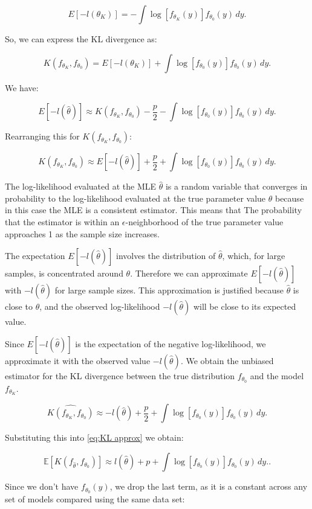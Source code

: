 \documentclass[
11pt, %
oneside, %
english, %
singlespacing, %
]{macthesis} %
\begin{document}
\[ 
E[-l(\theta_K)] = -\int \log[f_{\theta_K}(y)] f_{\theta_0}(y) \, dy. 
\]

So, we can express the KL divergence as:

\[ 
K(f_{\theta_K}, f_{\theta_0}) = E[-l(\theta_K)] + \int \log[f_{\theta_0}(y)] f_{\theta_0}(y) \, dy. 
\]

We have:

\[
E[-l(\hat{\theta})] \approx K(f_{\theta_K}, f_{\theta_0}) - \frac{p}{2} - \int \log[f_{\theta_0}(y)] f_{\theta_0}(y) \, dy. 
\]

Rearranging this for \(K(f_{\theta_K}, f_{\theta_0})\):

\[ 
K(f_{\theta_K}, f_{\theta_0}) \approx E[-l(\hat{\theta})] + \frac{p}{2} + \int \log[f_{\theta_0}(y)] f_{\theta_0}(y) \, dy. 
\]

The log-likelihood evaluated at the MLE \(\hat{\theta}\) is a random variable that converges in probability to the log-likelihood evaluated at the true parameter value \(\theta\) because in this case the MLE is a consistent estimator. This means that The probability that the estimator is within an
\(\epsilon\)-neighborhood of the true parameter value approaches 1 as the sample size increases.

The expectation \(E[-l(\hat{\theta})]\) involves the distribution of \(\hat{\theta}\), which, for large samples, is concentrated around \(\theta\). Therefore we can approximate \(E[-l(\hat{\theta})]\) with \(-l(\hat{\theta})\) for large sample sizes. This approximation is justified because \(\hat{\theta}\) is close to \(\theta\), and the observed log-likelihood \(-l(\hat{\theta})\) will be close to its expected value.

Since \(E[-l(\hat{\theta})]\) is the expectation of the negative log-likelihood, we approximate it with the observed value \(-l(\hat{\theta})\). We obtain the unbiased estimator for the KL divergence between the true distribution \(f_{\theta_0}\) and the model \(f_{\theta_K}\).

\[ 
\widehat{K(f_{\theta_K}, f_{\theta_0})}
 \approx -l(\hat{\theta}) + \frac{p}{2} + \int \log[f_{\theta_0}(y)] f_{\theta_0}(y) \, dy. 
\]

Substituting this into \ref{eq:KL approx} we obtain:

\[
\mathbb{E}[K(f_{\hat{\theta}}, f_{\theta_0})] \approx  l({\hat{\theta}}) + p+ \int \log[f_{\theta_0}(y)] f_{\theta_0}(y) \, dy. .
\]

Since we don't have \(f_{\theta_0}(y)\), we drop the last term, as it is a constant across any set of models compared using the same data set:
\end{document}
